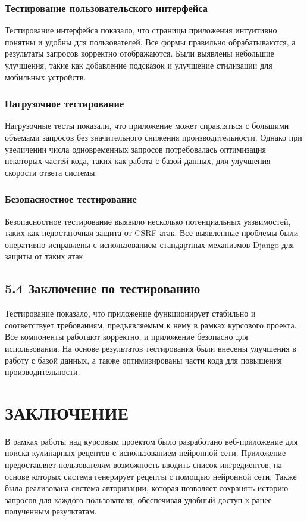 {\subsubsection*{Тестирование пользовательского интерфейса}
Тестирование интерфейса показало, что страницы приложения интуитивно понятны и удобны для пользователей. Все формы правильно обрабатываются, а результаты запросов корректно отображаются. Были выявлены небольшие улучшения, такие как добавление подсказок и улучшение стилизации для мобильных устройств.

\subsubsection*{Нагрузочное тестирование}
Нагрузочные тесты показали, что приложение может справляться с большими объемами запросов без значительного снижения производительности. Однако при увеличении числа одновременных запросов потребовалась оптимизация некоторых частей кода, таких как работа с базой данных, для улучшения скорости ответа системы.

\subsubsection*{Безопасностное тестирование}
Безопасностное тестирование выявило несколько потенциальных уязвимостей, таких как недостаточная защита от CSRF-атак. Все выявленные проблемы были оперативно исправлены с использованием стандартных механизмов Django для защиты от таких атак.

\subsection*{5.4 Заключение по тестированию}

Тестирование показало, что приложение функционирует стабильно и соответствует требованиям, предъявляемым к нему в рамках курсового проекта. Все компоненты работают корректно, и приложение безопасно для использования. На основе результатов тестирования были внесены улучшения в работу с базой данных, а также оптимизированы части кода для повышения производительности.

\newpage
\section{\MakeUppercase{Заключение}}
{
    В рамках работы над курсовым проектом было разработано веб-приложение для поиска кулинарных рецептов с использованием нейронной сети. Приложение предоставляет пользователям возможность вводить список ингредиентов, на основе которых система генерирует рецепты с помощью нейронной сети. Также была реализована система авторизации, которая позволяет сохранять историю запросов для каждого пользователя, обеспечивая удобный доступ к ранее полученным результатам.

}}
